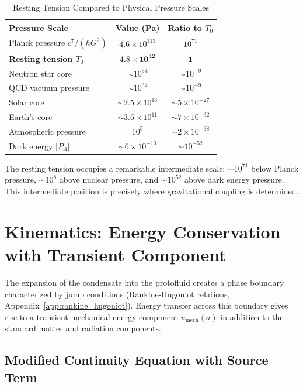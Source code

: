 \documentclass[11pt,a4paper]{article}
\newcommand{\Tzero}{\ensuremath{T_0}}
\newcommand{\umech}{\ensuremath{u_{\mathrm{mech}}}}
\theoremstyle{definition}
\theoremstyle{remark}
\begin{document}
\begin{table}[H]
\centering
\caption{Resting Tension Compared to Physical Pressure Scales}
\label{tab:pressure_comparison}
\begin{tabular}{@{}lcc@{}}
\toprule
\textbf{Pressure Scale} & \textbf{Value (Pa)} & \textbf{Ratio to $\Tzero$} \\
\midrule
Planck pressure $c^7/(\hbar G^2)$ & $4.6 \times 10^{113}$ & $10^{71}$ \\
\textbf{Resting tension $\Tzero$} & $\mathbf{4.8 \times 10^{42}}$ & $\mathbf{1}$ \\
Neutron star core & $\sim 10^{34}$ & $\sim 10^{-9}$ \\
QCD vacuum pressure & $\sim 10^{34}$ & $\sim 10^{-9}$ \\
Solar core & $\sim 2.5 \times 10^{16}$ & $\sim 5 \times 10^{-27}$ \\
Earth's core & $\sim 3.6 \times 10^{11}$ & $\sim 7 \times 10^{-32}$ \\
Atmospheric pressure & $10^5$ & $\sim 2 \times 10^{-38}$ \\
Dark energy $|P_\Lambda|$ & $\sim 6 \times 10^{-10}$ & $\sim 10^{-52}$ \\
\bottomrule
\end{tabular}
\end{table}

The resting tension occupies a remarkable intermediate scale: $\sim 10^{71}$ below Planck pressure, $\sim 10^8$ above nuclear pressure, and $\sim 10^{52}$ above dark energy pressure. This intermediate position is precisely where gravitational coupling is determined.

\section{Kinematics: Energy Conservation with Transient Component}
\label{sec:kinematics}

The expansion of the condensate into the protofluid creates a phase boundary characterized by jump conditions (Rankine-Hugoniot relations, Appendix~\ref{app:rankine_hugoniot}). Energy transfer across this boundary gives rise to a transient mechanical energy component $\umech(a)$ in addition to the standard matter and radiation components.

\subsection{Modified Continuity Equation with Source Term}
\label{sec:continuity_source}
\end{document}
